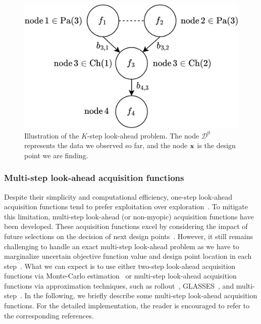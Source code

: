 \documentclass[iicol,sn-basic]{sn-jnl}%
\theoremstyle{thmstyleone}%
\theoremstyle{thmstyletwo}
\theoremstyle{thmstylethree}
\begin{document}
\begin{linenumbers}
\begin{figure}
	\centering
	\includegraphics[scale=0.85]{Fig6.png}
	\caption{Illustration of the $K$-step look-ahead problem. The node $\mathcal{D}^0$ represents the data we observed so far, and the node $\bf x$ is the design point we are finding.}
	\label{Fig6}
\end{figure}

\subsubsection{Multi-step look-ahead acquisition functions}\label{Sec612}

Despite their simplicity and computational efficiency, one-step look-ahead acquisition functions tend to prefer exploitation over exploration~\citep{Hennig2022}.
To mitigate this limitation, multi-step look-ahead (or non-myopic) acquisition functions have been developed.
These acquisition functions excel by considering the impact of future selections on the decision of next design points~\citep{Streltsov1999,Ginsbourger2010,Gonzalez2016,Lam2016,JWu2019,Jiang2020}.
However, it still remains challenging to handle an exact multi-step look-ahead problem as we have to marginalize uncertain objective function value and design point location in each step~\citep{Gonzalez2016,Hennig2022}.
What we can expect is to use either
two-step look-ahead acquisition functions via Monte-Carlo estimation~\citep{JWu2019} or multi-step look-ahead acquisition functions via approximation techniques, such as rollout~\citep{Lam2016,Lee2020,Paulson2022}, GLASSES~\citep{Gonzalez2016}, and multi-step~\citep{Jiang2020}.
In the following, we briefly describe some multi-step look-ahead acquisition functions.
For the detailed implementation, the reader is encouraged to refer to the corresponding references.


\end{linenumbers}
\end{document}
